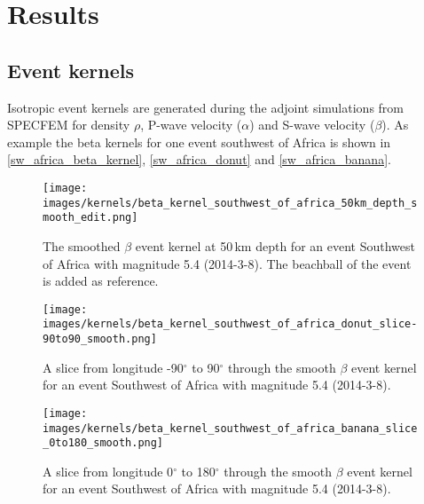 
\chapter{Results}

\section{Event kernels}

Isotropic event kernels are generated during the adjoint simulations from SPECFEM for density $\rho$, P-wave velocity ($\alpha$) 
and S-wave velocity ($\beta$). As example the beta kernels for one event southwest of Africa is shown in \autoref{sw_africa_beta_kernel},
\autoref{sw_africa_donut} and \autoref{sw_africa_banana}.



\begin{figure}[h]
\begin{center}
\texttt{[image: images/kernels/beta\_kernel\_southwest\_of\_africa\_50km\_depth\_smooth\_edit.png]}
\caption[Smoothed $\beta$ event kernel at 50$\,$km depth for one event]{The smoothed $\beta$ event kernel at 50$\,$km depth for an event 
Southwest of Africa with magnitude 5.4 (2014-3-8). The beachball of the event is added as reference.}  
\label{sw_africa_beta_kernel}
\end{center}
\end{figure}


\begin{figure}[h]
\begin{center}
\texttt{[image: images/kernels/beta\_kernel\_southwest\_of\_africa\_donut\_slice-90to90\_smooth.png]}
\caption[Slice from longitude -90$^\circ$ to 90$^\circ$ through the smooth $\beta$ event kernel for one event]{A slice from 
longitude -90$^\circ$ to 90$^\circ$ through the smooth $\beta$ event kernel for an event Southwest of Africa with 
magnitude 5.4 (2014-3-8). }  
\label{sw_africa_donut}
\texttt{[image: images/kernels/beta\_kernel\_southwest\_of\_africa\_banana\_slice\_0to180\_smooth.png]}
\caption[Slice from longitude 0$^\circ$ to 180$^\circ$ through the smooth $\beta$ event kernel for one event]{A slice from longitude 
0$^\circ$ to 180$^\circ$ through the smooth $\beta$ event kernel for an event Southwest of Africa with magnitude 5.4 (2014-3-8).}  
\label{sw_africa_banana}
\end{center}
\end{figure}


